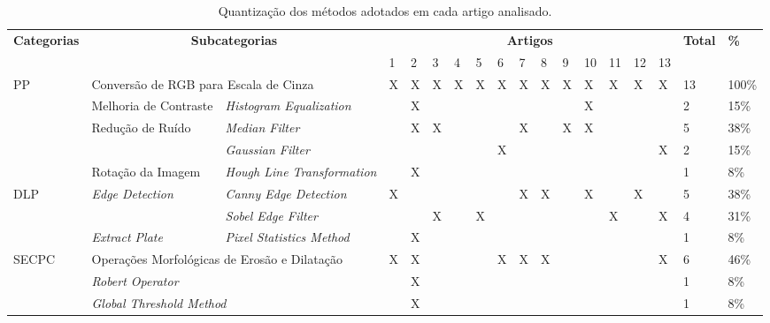 \begin{table}[htb]
	\ABNTEXfontereduzida
	\caption[\footnotesize Quantização dos métodos adotados.]{\footnotesize Quantização dos métodos adotados em cada artigo analisado.}
	\label{tab:quant}
	\begin{tabular}{p{1.7cm}|p{2.7cm}|p{2cm}|p{.1cm}|p{.1cm}|p{.1cm}|p{.1cm}|p{.1cm}|p{.1cm}|p{.1cm}|p{.1cm}|p{.1cm}|p{.1cm}|p{.1cm}|p{.1cm}|p{.1cm}|p{.7cm}|p{.4cm}}
		\hline
		\multirow{2}{*}{\textbf{Categorias}} & \multicolumn{2}{c}{\multirow{2}{*}{\textbf{Subcategorias}}} & \multicolumn{13}{|c|}{\textbf{Artigos}} & \multirow{2}{*}{\textbf{Total}} & \multirow{2}{*}{\textbf{\%}} \\
		\cline{4-16}
		& & & 1 & 2 & 3 & 4 & 5 & 6 & 7 & 8 & 9 & 10 & 11 & 12 & 13 & & \\
		\hline \hline
		\multirow{4}{*}{PP} & \multicolumn{2}{p{4.7cm}|}{Conversão de RGB para Escala de Cinza} & X & X & X & X & X & X & X & X & X & X & X & X & X & 13 & 100\% \\
		\cline{2-18}
		& Melhoria de Contraste & \textit{Histogram Equalization} &  & X &  &  &  &  &  &  &  & X &  &  &  & 2 & 15\% \\
		\cline{2-18}
		& \multirow{2}{*}{Redução de Ruído} & \textit{Median Filter} & & X & X &  &  &  & X &  & X & X &  &  &  & 5 & 38\% \\
		\cline{3-18}
		& & \textit{Gaussian Filter} & &  &  &  &  & X &  &  &  &  &  &  & X & 2 & 15\% \\
		\cline{2-18}
		& Rotação da Imagem & \textit{Hough Line Transformation} & & X &  &  &  &  &  &  &  &  &  &  &  & 1 & 8\% \\
		\hline
		\multirow{2}{*}{DLP} & \multirow{2}{*}{\textit{Edge Detection}} & \textit{Canny Edge Detection} & X &  &  &  &  &  & X & X &  & X &  & X &  & 5 & 38\% \\
		& & \textit{Sobel Edge Filter} &  &  & X &  & X &  &  &  &  &  & X &  & X & 4 & 31\% \\
		\cline{2-18}
		& \textit{Extract Plate} & \textit{Pixel Statistics Method} & & X &  &  &  &  &  &  &  &  &  &  &  & 1 & 8\% \\
		\hline
		\multirow{6}{*}{SECPC} & \multicolumn{2}{p{4.7cm}|}{Operações Morfológicas de Erosão e Dilatação} & X & X &  &  &  & X & X & X &  &  &  &  & X & 6 & 46\% \\
		\cline{2-18}
		& \multicolumn{2}{p{4.7cm}|}{\textit{Robert Operator}} &  & X &  &  &  &  &  &  &  &  &  &  &  & 1 & 8\% \\
		\cline{2-18}
		& \multicolumn{2}{p{4.7cm}|}{\textit{Global Threshold Method}} &  & X &  &  &  &  &  &  &  &  &  &  &  & 1 & 8\% \\

\end{tabular}
\end{table}
